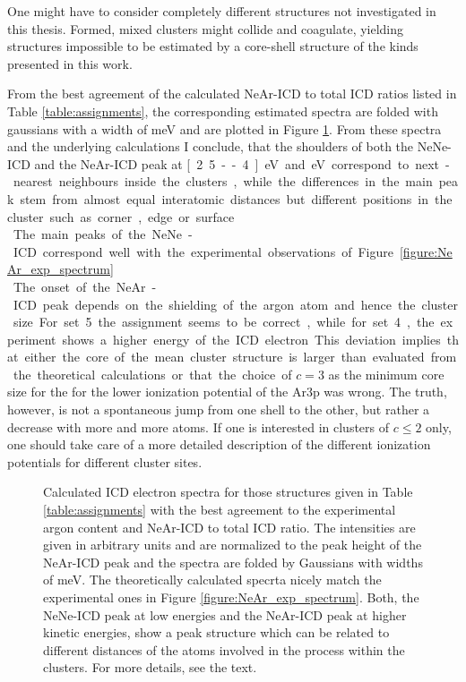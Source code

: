One might have to consider completely different structures not investigated in this
thesis. Formed, mixed clusters might collide and coagulate, yielding
structures impossible to be estimated by a core-shell structure of the kinds
presented in this work. 

From the best agreement of the calculated NeAr-ICD to total ICD ratios listed in Table
\ref{table:assignments}, the corresponding estimated spectra are folded
with gaussians with a width of \unit[250]{meV}
and are plotted in Figure
\ref{figure:theo_specs}.
From these spectra and the underlying calculations
I conclude, that the shoulders of both the NeNe-ICD and the NeAr-ICD peak
at \unit[2.5--4]{eV} and \unit[8--10]{eV}
correspond to next-nearest neighbours inside the clusters, while the differences
in the main peak stem from almost equal interatomic distances but different positions
in the cluster such as corner, edge or surface.\\
The main peaks of the NeNe-ICD correspond well with the experimental observations
of Figure \ref{figure:NeAr_exp_spectrum}.\\
The onset of the NeAr-ICD peak depends on the shielding of the argon atom
and hence the cluster size. For set 5 the assignment seems to be correct, while
for set 4, the experiment shows a higher energy of the ICD electron. 
This deviation implies that either the core of the mean cluster structure
is larger than evaluated from the theoretical calculations or that
the choice of $c=3$ as the minimum core size for the for the lower ionization
potential of the Ar3p was wrong.
The truth, however, is not a spontaneous jump from one shell to the other, but rather a decrease
with more and more atoms. If one is interested in clusters of $c\le2$ only, one
should take care of a more detailed description of the different ionization
potentials for different cluster sites.

\begin{figure}[!ht]
  \centering
  
  \caption{Calculated ICD electron spectra for those structures given in Table
           \ref{table:assignments} with the best agreement to the experimental
           argon content and NeAr-ICD to total ICD ratio. The intensities are given
           in arbitrary units and are normalized to the peak height of the NeAr-ICD
           peak and the spectra are folded by Gaussians with widths of \unit[250]{meV}.
           The theoretically calculated specrta nicely match the experimental ones in Figure
           \ref{figure:NeAr_exp_spectrum}.
           Both, the NeNe-ICD peak at low energies and the NeAr-ICD peak
           at higher kinetic energies, show a peak structure which can be related
           to different distances of the atoms involved in the process within the
           clusters. For more details, see the text.}
  \label{figure:theo_specs}
\end{figure}

